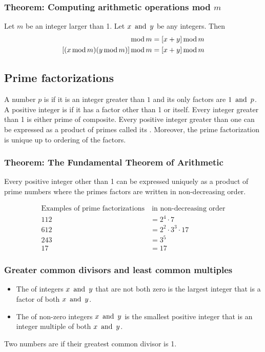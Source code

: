 \subsubsection*{Theorem: Computing arithmetic operations mod $m$}
Let $m$ be an integer larger than 1. Let $x \operatorname{~\text{and}~} y$ be any integers. Then
\begin{align*}
  [(x \tmod m) + (y \tmod m)] \tmod m & = [x + y] \tmod m \\
  [(x \tmod m)(y \tmod m)] \tmod m    & = [x + y] \tmod m
\end{align*}

\subsection{Prime factorizations}
A number $p$ is  if it is an integer greater than $1$ and its only factors are $1 \operatorname{~\text{and}~} p$. A positive integer is  if it has a factor other than 1 or itself. Every integer greater than 1 is either prime of composite. Every positive integer greater than one can be expressed as a product of primes called its . Moreover, the prime factorization is unique up to ordering of the factors.

\subsubsection*{Theorem: The Fundamental Theorem of Arithmetic}
Every positive integer other than 1 can be expressed uniquely as a product of prime numbers where the primes factors are written in non-decreasing order.

\begin{align*}
  \text{Examples of prime factorizations} & ~\text{in non-decreasing order} \\
  112                                     & = 2^4\cdot 7                    \\
  612                                     & = 2^2 \cdot 3^3 \cdot 17        \\
  243                                     & = 3^5                           \\
  17                                      & = 17
\end{align*}

\subsubsection*{Greater common divisors and least common multiples}
\begin{itemize}
  \item The  of integers $x \operatorname{~\text{and}~} y$ that are not both zero is the largest integer that is a factor of both $x \operatorname{~\text{and}~} y$.
  \item The  of non-zero integers $x \operatorname{~\text{and}~} y$ is the smallest positive integer that is an integer multiple of both $x \operatorname{~\text{and}~} y$.
\end{itemize}
Two numbers are  if their greatest common divisor is 1.

